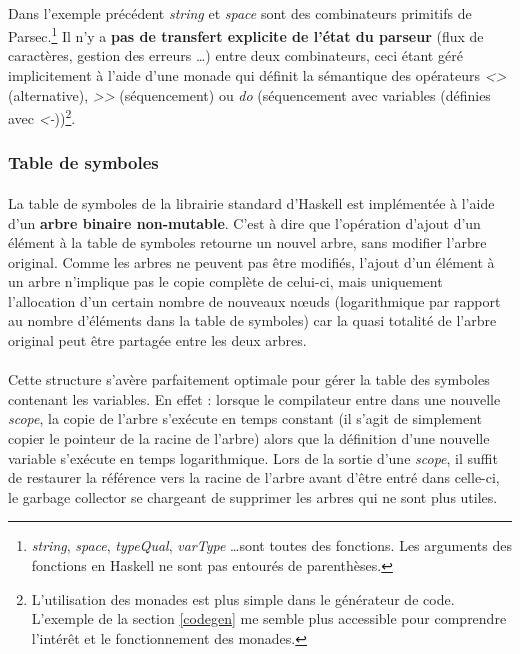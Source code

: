 \documentclass[a4paper]{article}
\begin{document}
    \paragraph{}Dans l'exemple précédent \textit{string} et \textit{space} sont
des combinateurs primitifs de Parsec.\footnote{\textit{string}, \textit{space},
\textit{typeQual}, \textit{varType} \dots sont toutes des fonctions. Les
arguments des fonctions en Haskell ne sont pas entourés de parenthèses.}
\newline
Il n'y a \textbf{pas de transfert explicite de l'état du parseur} (flux de
caractères, gestion des erreurs \dots) entre deux combinateurs, ceci étant géré
implicitement à l'aide d'une monade qui définit la sémantique des opérateurs
\textit{\textless\textbar\textgreater} (alternative),
\textit{\textgreater\textgreater} (séquencement) ou \textit{do} (séquencement
avec variables (définies avec \textit{\textless-}))\footnote{L'utilisation des
monades est plus simple dans le générateur de code. L'exemple de la section
\ref{codegen} me semble plus accessible pour comprendre l’intérêt et le
fonctionnement des monades.}.

   \subsubsection{Table de symboles}

    \paragraph{}La table de symboles de la librairie standard d'Haskell
est implémentée à l'aide d'un \textbf{arbre binaire non-mutable}. C'est à dire
que l'opération d'ajout d'un élément à la table de symboles retourne un nouvel
arbre, sans modifier l'arbre original. \newline
Comme les arbres ne peuvent pas être modifiés, l'ajout d'un élément à un arbre
n'implique pas le copie complète de celui-ci, mais uniquement l'allocation
d'un certain nombre de nouveaux nœuds (logarithmique par rapport au nombre
d'éléments dans la table de symboles) car la quasi totalité de l'arbre original
peut être partagée entre les deux arbres.

    \paragraph{}Cette structure s'avère parfaitement optimale pour gérer la
table des symboles contenant les variables. En effet : lorsque le compilateur
entre dans une nouvelle \textit{scope}, la copie de l'arbre s'exécute en temps
constant (il s'agit de simplement copier le pointeur de la racine de l'arbre)
alors que la définition d'une nouvelle variable s'exécute en temps
logarithmique. Lors de la sortie d'une \textit{scope}, il suffit de
restaurer la référence vers la racine de l'arbre avant d'être entré dans
celle-ci, le garbage collector se chargeant de supprimer les arbres qui ne sont
plus utiles.
\end{document}
